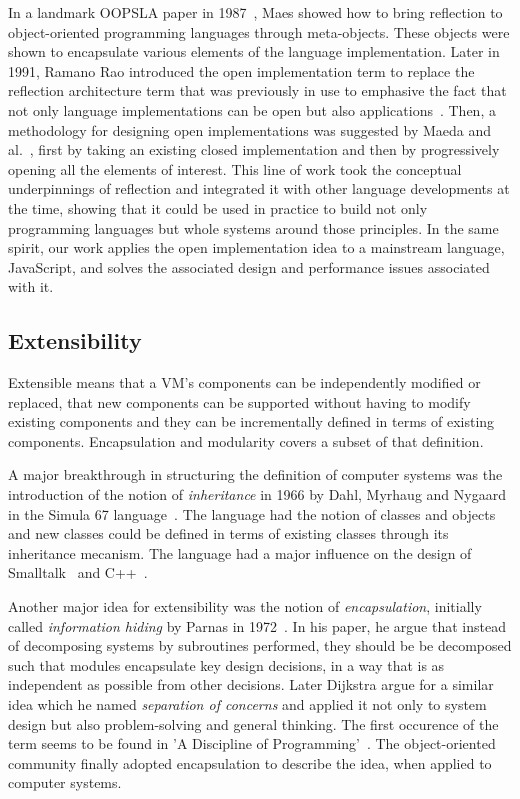In a landmark OOPSLA paper in 1987~\cite{Maes:1987}, Maes showed how to
bring reflection to object-oriented programming languages through meta-objects.
These objects were shown to encapsulate various elements of the language
implementation. Later in 1991, Ramano Rao introduced the open implementation
term to replace the reflection architecture term that was previously in use to
emphasive the fact that not only language implementations can be open but also
applications~\cite{Rao:1991}. Then, a methodology for designing open
implementations was suggested by Maeda and al.~\cite{Maeda:1997}, first by
taking an existing closed implementation and then by progressively opening all
the elements of interest. This line of work took the conceptual underpinnings
of reflection and integrated it with other language developments at the time,
showing that it could be used in practice to build not only programming
languages but whole systems around those principles. In the same spirit, our
work applies the open implementation idea to a mainstream language, JavaScript,
and solves the associated design and performance issues associated with it.

\subsection{Extensibility}

Extensible means that a VM's components can be independently modified or
replaced, that new components can be supported without having to modify
existing components and they can be incrementally defined in terms of existing
components. Encapsulation and modularity covers a subset of that definition. 

A major breakthrough in structuring the definition of computer systems was the
introduction of the notion of \textit{inheritance} in 1966 by Dahl, Myrhaug and
Nygaard in the Simula 67 language~\cite{Dahl:1968}. The language had the notion
of classes and objects and new classes could be defined in terms of existing
classes through its inheritance mecanism. The language had a major influence on
the design of Smalltalk~\cite{Kay:1993} and C++~\cite{Stroustrup:2007}.

Another major idea for extensibility was the notion of \textit{encapsulation},
initially called \textit{information hiding} by Parnas in
1972~\cite{Parnas:1972}. In his paper, he argue that instead of decomposing
systems by subroutines performed, they should be be decomposed such that modules
encapsulate key design decisions, in a way that is as independent as possible
from other decisions.  Later Dijkstra argue for a similar idea which he named
\textit{separation of concerns} and applied it not only to system design but
also problem-solving and general thinking. The first occurence of the term
seems to be found in 'A Discipline of Programming'~\cite{dijkstra:1976}. The
object-oriented community finally adopted encapsulation to describe the idea,
when applied to computer systems.

